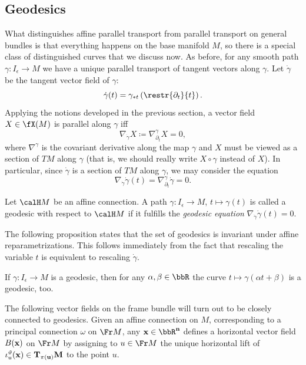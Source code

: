 \subsection{Geodesics}


What distinguishes affine parallel transport from parallel transport on general bundles is that everything happens on the base manifold $M$, so there is a special class of distinguished curves that we discuss now. As before, for any smooth path $\gamma:I_\epsilon\to M$ we have a unique parallel transport of tangent vectors along $\gamma$. Let $\dot\gamma$ be the tangent vector field of $\gamma$:
\[\dot\gamma(t)=\gamma_{\ast t}\left(\restr{\partial_t}{t}\right).\]
Applying the notions developed in the previous section, a vector field $X\in \fX(M)$ is parallel along $\gamma$ iff 
\[\nabla_{\dot\gamma}X\coloneqq \nabla^\gamma_{\partial_t}X=0,\label{eq 2.1.34 RS2}\]
where $\nabla^\gamma$ is the covariant derivative along the map $\gamma$ and $X$ must be viewed as a section of $TM$ along $\gamma$ (that is, we should really write $X\circ\gamma$ instead of $X$). In particular, since $\dot\gamma$ is a section of $TM$ along $\gamma$, we may consider the equation 
\[\nabla_{\dot\gamma}\dot\gamma(t)=\nabla^\gamma_{\partial_t}\dot\gamma=0.\label{eq 2.1.35 RS2}\] 

\begin{defn}[Geodesic]
    Let $\calH M$ be an affine connection. A path $\gamma:I_\epsilon\to M$, $t\mapsto \gamma(t)$ is called a geodesic with respect to $\calH M$ if it fulfills the \emph{geodesic equation} $\nabla_{\dot\gamma}\dot\gamma(t)=0$.
\end{defn}

The following proposition states that the set of geodesics is invariant under affine reparametrizations. This follows immediately from the fact that rescaling the variable $t$ is equivalent to rescaling $\dot\gamma$.
\begin{prop}[{{\cite[Prop.~2.1.21]{RS2}}}]\label{prop 2.1.21 RS2}
    If $\gamma:I_\epsilon\to M$ is a geodesic, then for any $\alpha,\beta\in\bbR$ the curve $t\mapsto \gamma(\alpha t+\beta)$ is a geodesic, too.
\end{prop}


The following vector fields on the frame bundle will turn out to be closely connected to geodesics. Given an affine connection on $M$, corresponding to a principal connection $\omega$ on $\Fr M$, any $\bf{x}\in\bbR^n$ defines a horizontal vector field $B(\bf{x})$ on $\Fr M$ by assigning to $u\in\Fr M$ the unique horizontal lift of $\iota_u^\vartheta(\bf{x})\in T_{\pi(u)}M$ to the point $u$.

